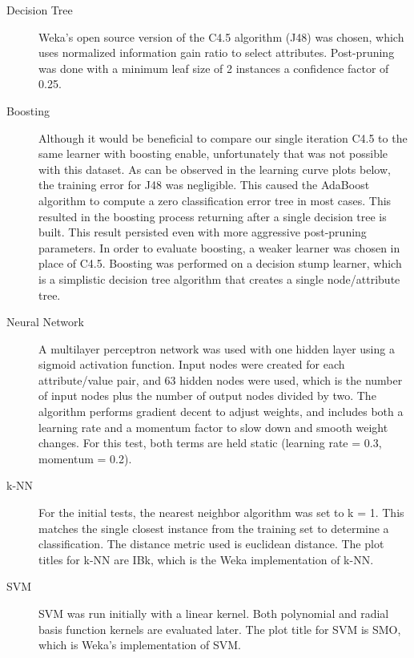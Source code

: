 \documentclass{sig-alternate}
\begin{document}
\begin{description}
    \item[Decision Tree] Weka's open source version of the C4.5 algorithm (J48) was chosen, which uses normalized information gain ratio to select attributes. Post-pruning was done with a minimum leaf size of 2 instances a confidence factor of 0.25.
    \item[Boosting] Although it would be beneficial to compare our single iteration C4.5 to the same learner with boosting enable, unfortunately that was not possible with this dataset. As can be observed in the learning curve plots below, the training error for J48 was negligible. This caused the AdaBoost algorithm to compute a zero classification error tree in most cases. This resulted in the boosting process returning after a single decision tree is built. This result persisted even with more aggressive post-pruning parameters. In order to evaluate boosting, a weaker learner was chosen in place of C4.5. Boosting was performed on a decision stump learner, which is a simplistic decision tree algorithm that creates a single node/attribute tree.
    \item[Neural Network] A multilayer perceptron network was used with one hidden layer using a sigmoid activation function. Input nodes were created for each attribute/value pair, and 63 hidden nodes were used, which is the number of input nodes plus the number of output nodes divided by two. The algorithm performs gradient decent to adjust weights, and includes both a learning rate and a momentum factor to slow down and smooth weight changes. For this test, both terms are held static (learning rate = 0.3, momentum = 0.2).
    \item[k-NN] For the initial tests, the nearest neighbor algorithm was set to k = 1. This matches the single closest instance from the training set to determine a classification. The distance metric used is euclidean distance. The plot titles for k-NN are IBk, which is the Weka implementation of k-NN. 
    \item[SVM] SVM was run initially with a linear kernel. Both polynomial and radial basis function kernels are evaluated later. The plot title for SVM is SMO, which is Weka's implementation of SVM.
\end{description}
\end{document}
